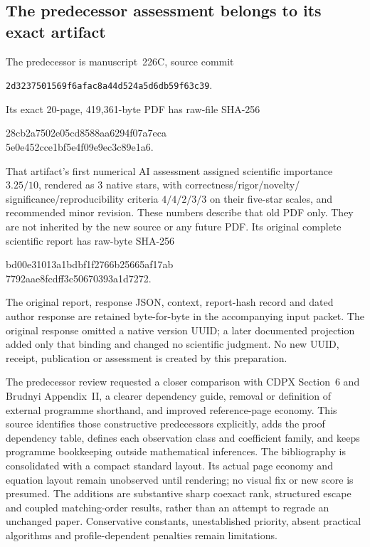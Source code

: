 \subsection*{The predecessor assessment belongs to its exact artifact}
The predecessor is manuscript~226C, source commit
\begin{center}\small\texttt{2d3237501569f6afac8a44d524a5d6db59f63c39}.\end{center}
Its exact 20-page, 419,361-byte PDF has raw-file SHA-256
\begin{center}\small\ttfamily
28cb2a7502e05cd8588aa6294f07a7eca\\
5e0e452cce1bf5e4f09e9ec3c89e1a6.
\end{center}
That artifact's first numerical AI assessment assigned scientific importance
$3.25/10$, rendered as 3 native stars, with correctness/rigor/novelty/
significance/reproducibility criteria $4/4/2/3/3$ on their five-star scales,
and recommended minor revision. These numbers describe that old PDF only.
They are not inherited by the new source or any future PDF. Its original
complete scientific report has raw-byte SHA-256
\begin{center}\small\ttfamily
bd00e31013a1bdbf1f2766b25665af17ab\\
7792aae8fcdff3c50670393a1d7272.
\end{center}
The original report, response JSON, context, report-hash record and dated
author response are retained byte-for-byte in the accompanying input packet.
The original response omitted a native version UUID; a later documented
projection added only that binding and changed no scientific judgment.
No new UUID, receipt, publication or assessment is created by this preparation.

The predecessor review requested a closer comparison with CDPX Section~6
and Brudnyi Appendix~II, a clearer dependency guide, removal or definition
of external programme shorthand, and improved reference-page economy.
This source identifies those constructive predecessors explicitly, adds the
proof dependency table, defines each observation class and coefficient family,
and keeps programme bookkeeping outside mathematical inferences.
The bibliography is consolidated with a compact standard layout. Its actual
page economy and equation layout remain unobserved until rendering; no
visual fix or new score is presumed. The additions are substantive sharp
coexact rank, structured escape and coupled matching-order results, rather
than an attempt to regrade an unchanged paper. Conservative constants,
unestablished priority, absent practical algorithms and profile-dependent
penalties remain limitations.

